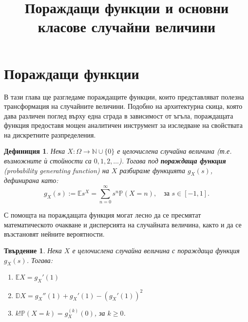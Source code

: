 \documentclass{article}
\title{Пораждащи функции и основни класове случайни величини}
\author{}
\date{}
\newtheorem{theorem}{Твърдение}
\newtheorem{definition}{Дефиниция}
\begin{document}
\maketitle

\section{Пораждащи функции}

В тази глава ще разгледаме пораждащите функции, които представляват полезна трансформация на случайните величини. Подобно на архитектурна скица, която дава различен поглед върху една сграда в зависимост от ъгъла, пораждащата функция предоставя мощен аналитичен инструмент за изследване на свойствата на дискретните разпределения.

\begin{definition}
Нека $X : \Omega \rightarrow \mathbb{N} \cup \{0\}$ е целочислена случайна величина (т.е. възможните ѝ стойности са $0, 1, 2, \dots$). Тогава под \textbf{пораждаща функция} (probability generating function) на $X$ разбираме функцията $g_X(s)$, дефинирана като:
\[ g_X(s) := \mathbb{E}s^X = \sum_{n=0}^{\infty} s^n \mathbb{P}(X=n), \quad \text{за } s \in [-1, 1]. \]
\end{definition}

С помощта на пораждащата функция могат лесно да се пресмятат математическото очакване и дисперсията на случайната величина, както и да се възстановят нейните вероятности.

\begin{theorem}
Нека $X$ е целочислена случайна величина с пораждаща функция $g_X(s)$. Тогава:
\begin{enumerate}
    \item[а)] $\mathbb{E}X = g_X'(1)$
    \item[б)] $\mathbb{D}X = g_X''(1) + g_X'(1) - (g_X'(1))^2$
    \item[в)] $k! \mathbb{P}(X=k) = g_X^{(k)}(0)$, за $k \ge 0$.
\end{enumerate}
\end{theorem}
\end{document}

